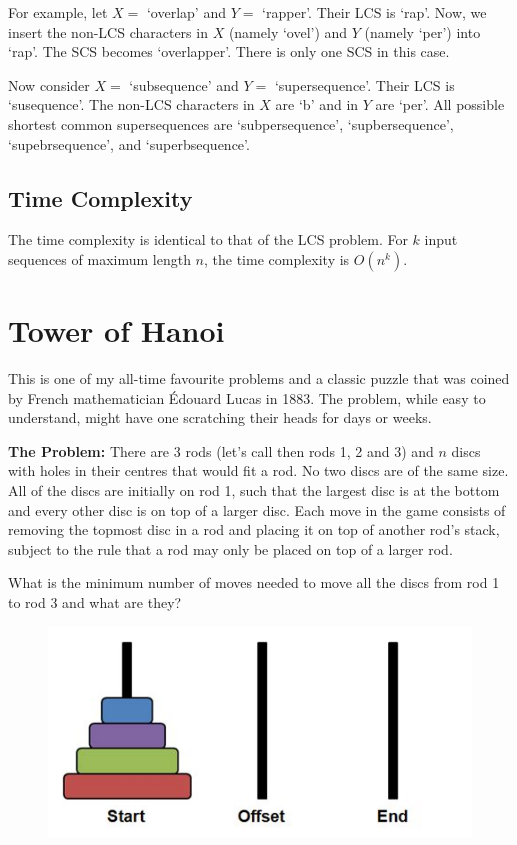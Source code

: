 \documentclass[12pt, a4paper]{article}
\theoremstyle{definition}
\theoremstyle{remark}
\begin{document}
For example, let $X=$ `overlap' and $Y=$ `rapper'. Their LCS is `rap'. Now, we insert the non-LCS characters in $X$ (namely `ovel') and $Y$ (namely `per') into `rap'. The SCS becomes `overlapper'. There is only one SCS in this case.

Now consider $X=$ `subsequence' and $Y=$ `supersequence'. Their LCS is `susequence'. The non-LCS characters in $X$ are `b' and in $Y$ are `per'.
All possible shortest common supersequences are `subpersequence', `supbersequence', `supebrsequence', and `superbsequence'.

\subsection{Time Complexity}
The time complexity is identical to that of the LCS problem. For $k$ input sequences of maximum length $n$, the time complexity is $O(n^k)$.

\section{Tower of Hanoi}
This is one of my all-time favourite problems and a classic puzzle that was coined by French mathematician Édouard Lucas in 1883. The problem, while easy to understand, might have one scratching their heads for days or weeks.

\begin{tcolorbox}
    \textbf{The Problem:} There are 3 rods (let's call then rods 1, 2 and 3) and $n$ discs with holes in their centres that would fit a rod. No two discs are of the same size. All of the discs are initially on rod 1, such that the largest disc is at the bottom and every other disc is on top of a larger disc. Each move in the game consists of removing the topmost disc in a rod and placing it on top of another rod's stack, subject to the rule that a rod may only be placed on top of a larger rod.

    What is the minimum number of moves needed to move all the discs from rod 1 to rod 3 and what are they?
\end{tcolorbox}

\begin{figure}[!h]
    \centering
    \includegraphics[scale=1]{img/Tower of Hanoi - Sample.png}
\end{figure}
\end{document}
